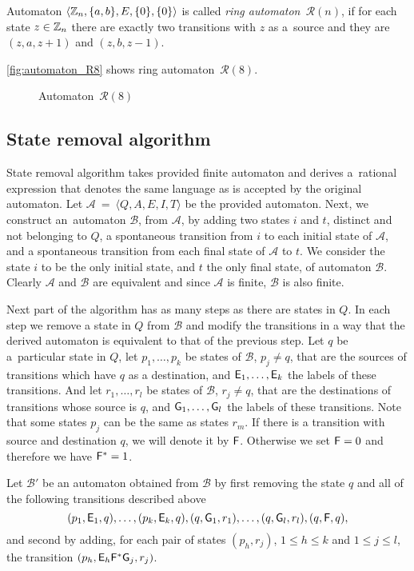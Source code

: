 \begin{defn}
    Automaton $\langle \mathbb{Z}_n, \{a,b\}, E, \{0\}, \{0\} \rangle$ is called \emph{ring automaton~${\mathcal{R}(n)}$}, if for each state $z \in \mathbb{Z}_n$ there are exactly two transitions with $z$ as a~source and they are $(z, a, z+1)$ and $(z, b, z-1)$.
\end{defn}

\begin{example}
    \autoref*{fig:automaton_R8} shows ring automaton~${\mathcal{R}(8)}$.

    \begin{figure}[h]
        \centering
        
        \caption{Automaton~${\mathcal{R}(8)}$}\label{fig:automaton_R8}
    \end{figure}
\end{example}

\subsection{State removal algorithm}

State removal algorithm takes provided finite automaton and derives a~rational expression that denotes the same language as is accepted by the original automaton. Let $\mathcal{A}~=~\langle Q, A, E, I, T \rangle$ be the provided automaton. Next, we construct an~automaton $\mathcal{B}$, from $\mathcal{A}$, by adding two states $i$ and $t$, distinct and not belonging to $Q$, a spontaneous transition from $i$ to each initial state of $\mathcal{A}$, and a spontaneous transition from each final state of $\mathcal{A}$ to $t$. We consider the state $i$ to be the only initial state, and $t$ the only final state, of automaton $\mathcal{B}$. Clearly $\mathcal{A}$ and $\mathcal{B}$ are equivalent and since $\mathcal{A}$ is finite, $\mathcal{B}$ is also finite.

Next part of the algorithm has as many steps as there are states in $Q$. In each step we remove a state in $Q$ from $\mathcal{B}$ and modify the transitions in a way that the derived automaton is equivalent to that of the previous step. Let $q$ be a~particular state in $Q$, let $p_1, \dotsc , p_k$ be states of $\mathcal{B}$, $p_j \neq q$, that are the sources of transitions which have $q$ as a destination, and ${\mathsf{E}}_1, \dotsc , {\mathsf{E}}_k$ the labels of these transitions. And let $r_1, \dotsc , r_l$ be states of $\mathcal{B}$, $r_j \neq q$, that are the destinations of transitions whose source is $q$, and ${\mathsf{G}}_1, \dotsc , {\mathsf{G}}_l$ the labels of these transitions. Note that some states $p_j$ can be the same as states $r_m$. If there is a transition with source and destination $q$, we will denote it by ${\mathsf{F}}$. Otherwise we set ${\mathsf{F}} = 0$ and therefore we have ${\mathsf{F}}^* = 1$.

Let $\mathcal{B}'$ be an automaton obtained from $\mathcal{B}$ by first removing the state $q$ and all of the following transitions described above
\[
    (p_1, {\mathsf{E}}_1, q), \dotsc, (p_k, {\mathsf{E}}_k, q), (q, {\mathsf{G}}_1, r_1), \dotsc, (q, {\mathsf{G}}_l, r_l), (q, {\mathsf{F}}, q),
\]
and second by adding, for each pair of states $(p_h, r_j)$, $1 \leq h \leq k$ and $1 \leq j \leq l$, the transition $(p_h, {\mathsf{E}}_h {\mathsf{F}}^* {\mathsf{G}}_j, r_j)$.

